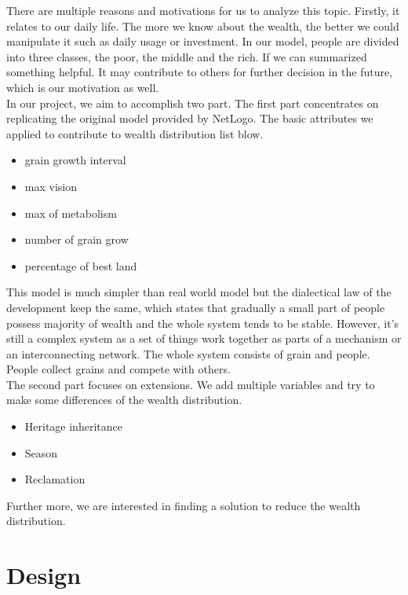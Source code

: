 There are multiple reasons and motivations for us to analyze this topic. Firstly, it relates to our daily life. The more we know about the wealth, the better we could manipulate it such as daily usage or investment. In our model, people are divided into three classes, the poor, the middle and the rich. If we can summarized something helpful. It may contribute to others for further decision in the future, which is our motivation as well.\\

In our project, we aim to accomplish two part. The first part concentrates on replicating the original model provided by NetLogo. The basic attributes we applied to contribute to wealth distribution list blow.
\begin{multicols}{2}
  \begin{itemize}
	\item grain growth interval
	\item max vision
	\item max of metabolism
	\item number of grain grow
	\item percentage of best land
\end{itemize}
\end{multicols}
This model is much simpler than real world model but the dialectical law of the development keep the same, which states that gradually a small part of people possess majority of wealth and the whole system tends to be stable. However, it's still a complex system as a set of things work together as parts of a mechanism or an interconnecting network. The whole system consists of grain and people. People collect grains and compete with others.\\


The second part focuses on extensions. We add multiple variables and try to make some differences of the wealth distribution.
   \begin{itemize}
 	\item Heritage inheritance
 	\item Season
 	\item Reclamation
 \end{itemize}
Further more, we are interested in finding a solution to reduce the wealth distribution.
\section{Design}
